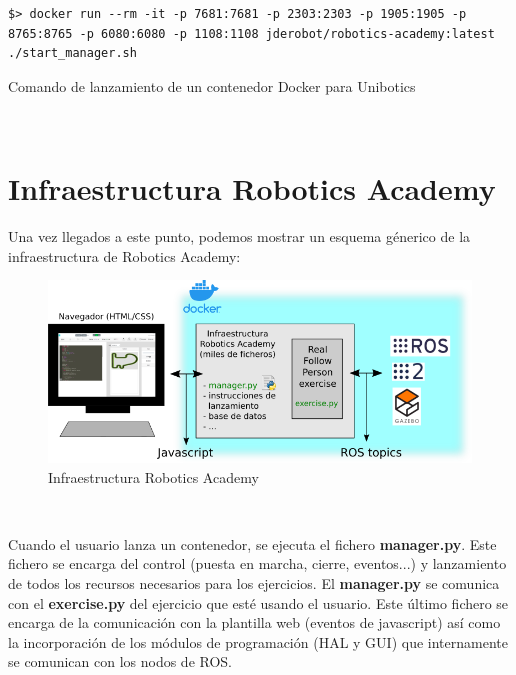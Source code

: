 \begin{code}[H]
\begin{lstlisting}
$> docker run --rm -it -p 7681:7681 -p 2303:2303 -p 1905:1905 -p 8765:8765 -p 6080:6080 -p 1108:1108 jderobot/robotics-academy:latest ./start_manager.sh
\end{lstlisting}
\caption{Comando de lanzamiento de un contenedor Docker para Unibotics}
\label{cod:comando_lanzamiento_docker_unibotics}
\end{code}\





\section{Infraestructura Robotics Academy}
\label{sec:infraestructura_robotics_academy}
Una vez llegados a este punto, podemos mostrar un esquema génerico de la infraestructura de Robotics Academy:

\begin{figure} [H]
  \begin{center}
    \includegraphics[width=15cm]{imagenes/esquema-robotics-academy.png}
  \end{center}
  \caption{Infraestructura Robotics Academy}
  \label{fig:infraestructura_robotics_academy}
\end{figure}\

Cuando el usuario lanza un contenedor, se ejecuta el fichero \textbf{manager.py}. Este fichero se encarga del control (puesta en marcha, cierre, eventos...) y lanzamiento de todos los recursos necesarios para los ejercicios. El \textbf{manager.py} se comunica con el \textbf{exercise.py} del ejercicio que esté usando el usuario. Este último fichero se encarga de la comunicación con la plantilla web (eventos de javascript) así como la incorporación de los módulos de programación (HAL y GUI) que internamente se comunican con los nodos de ROS.\\



